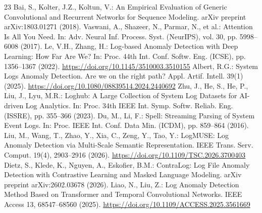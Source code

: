 \documentclass[a4paper]{llncs}
\begin{document}
\begin{thebibliography}{23}
 Bai, S., Kolter, J.Z., Koltun, V.: An Empirical Evaluation of Generic Convolutional and Recurrent Networks for Sequence Modeling. arXiv preprint arXiv:1803.01271 (2018).
 Vaswani, A., Shazeer, N., Parmar, N., et al.: Attention Is All You Need. In: Adv. Neural Inf. Process. Syst. (NeurIPS), vol. 30, pp. 5998--6008 (2017).
 Le, V.H., Zhang, H.: Log-based Anomaly Detection with Deep Learning: How Far Are We? In: Proc. 44th Int. Conf. Softw. Eng. (ICSE), pp. 1356--1367 (2022). \url{https://doi.org/10.1145/3510003.3510155}
 Albert, R.G.: System Logs Anomaly Detection. Are we on the right path? Appl. Artif. Intell. 39(1) (2025). \url{https://doi.org/10.1080/08839514.2024.2440692}
 Zhu, J., He, S., He, P., Liu, J., Lyu, M.R.: Loghub: A Large Collection of System Log Datasets for AI-driven Log Analytics. In: Proc. 34th IEEE Int. Symp. Softw. Reliab. Eng. (ISSRE), pp. 355--366 (2023).
 Du, M., Li, F.: Spell: Streaming Parsing of System Event Logs. In: Proc. IEEE Int. Conf. Data Min. (ICDM), pp. 859--864 (2016).
 Liu, M., Wang, T., Zhao, Y., Xia, C., Zeng, Y., Tao, Y.: LogMUSE: Log Anomaly Detection via Multi-Scale Semantic Representation. IEEE Trans. Serv. Comput. 19(4), 2903--2916 (2026). \url{https://doi.org/10.1109/TSC.2026.3700403}
 Dietz, S., Klede, K., Nguyen, A., Eskofier, B.M.: ContraLog: Log File Anomaly Detection with Contrastive Learning and Masked Language Modeling. arXiv preprint arXiv:2602.03678 (2026).
 Liao, N., Liu, Z.: Log Anomaly Detection Method Based on Transformer and Temporal Convolutional Networks. IEEE Access 13, 68547--68560 (2025). \url{https://doi.org/10.1109/ACCESS.2025.3561669}
\end{thebibliography}
\end{document}
